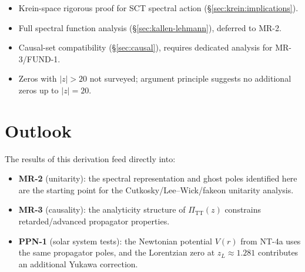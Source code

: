 \documentclass[11pt,a4paper]{article}
\theoremstyle{definition}
\theoremstyle{remark}
\newcommand{\gap}{\textcolor{red!80!black}{\textsf{[GAP]}}}
\begin{document}
\begin{itemize}[nosep]
  \item[\gap] Krein-space rigorous proof for SCT spectral action
    (\S\ref{sec:krein:implications}).
  \item[\gap] Full spectral function analysis (\S\ref{sec:kallen-lehmann}),
    deferred to MR-2.
  \item[\gap] Causal-set compatibility (\S\ref{sec:causal}), requires
    dedicated analysis for MR-3/FUND-1.
  \item[\gap] Zeros with $|z| > 20$ not surveyed; argument principle
    suggests no additional zeros up to $|z| = 20$.
\end{itemize}


\section{Outlook}
\label{sec:outlook}

The results of this derivation feed directly into:
\begin{itemize}[nosep]
  \item \textbf{MR-2} (unitarity): the spectral representation and ghost
    poles identified here are the starting point for the
    Cutkosky/Lee--Wick/fakeon unitarity analysis.
  \item \textbf{MR-3} (causality): the analyticity structure of
    $\Pi_{\mathrm{TT}}(z)$ constrains retarded/advanced propagator
    properties.
  \item \textbf{PPN-1} (solar system tests): the Newtonian potential
    $V(r)$ from NT-4a uses the same propagator poles, and the
    Lorentzian zero at $z_L \approx 1.281$ contributes an additional
    Yukawa correction.
\end{itemize}
\end{document}
